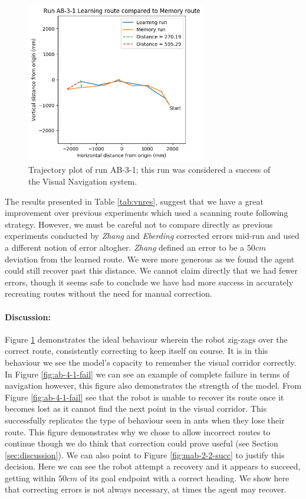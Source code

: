 \documentclass[a4paper,11pt,twoside,openright]{article}
\begin{document}
\begin{figure}
 \centering
  \includegraphics[width=0.7\textwidth]{AB-3-1}
  \caption{
    \label{fig:ab-3-1-succ} Trajectory plot of run AB-3-1; this run was considered a success of the Visual Navigation
    system.
  }
\end{figure}

The results presented in Table \ref{tab:vnres}, suggest that we have a great improvement over previous experiments which used a scanning route
following strategy. However, we must be careful not to compare directly as previous experiments conducted by \textit{Zhang} and \textit{Eberding}
corrected errors mid-run and used a
different notion of error altogher. \textit{Zhang} defined an error to be a $50cm$ deviation from the learned route. We were
more generous as we found the agent could still recover past this distance. We cannot claim directly that we had fewer errors,
though it seems safe to conclude we have had more success in accurately recreating routes without the need for manual correction.
\newline

\paragraph{Discussion:}
Figure \ref{fig:ab-3-1-succ} demonstrates the ideal behaviour wherein the robot zig-zags over the correct route, consistently
correcting to keep itself on course. It is in this behaviour we see the model's capacity to remember the visual corridor
correctly. In Figure \ref{fig:ab-4-1-fail} we can see an example of complete failure in terms of navigation however, this
figure also demonstrates the strength of the model. From Figure \ref{fig:ab-4-1-fail} see that the robot is unable to recover its route once it becomes
lost as it cannot find the next point in the visual corridor. This successfully replicates the type of behaviour seen in ants
when they lose their route\cite{Wehner2006}. This figure demonstrates why we chose to allow incorrect routes to continue though we do think that
correction could prove useful (see Section \ref{sec:discussion}). We can also point to Figure \ref{fig:mab-2-2-succ} to justify this decision.
Here we can see the robot attempt a recovery and it appears to succeed, getting within $50cm$ of its goal endpoint with a correct heading.
We show here that correcting errors is not always necessary, at times the agent may recover.
\newline
\end{document}
